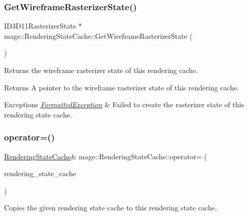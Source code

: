 \subsubsection{\texorpdfstring{Get\+Wireframe\+Rasterizer\+State()}{GetWireframeRasterizerState()}}
{\footnotesize\ttfamily I\+D3\+D11\+Rasterizer\+State $\ast$ mage\+::\+Rendering\+State\+Cache\+::\+Get\+Wireframe\+Rasterizer\+State (\begin{DoxyParamCaption}{ }\end{DoxyParamCaption})}

Returns the wireframe rasterizer state of this rendering cache.

\begin{DoxyReturn}{Returns}
A pointer to the wireframe rasterizer state of this rendering cache. 
\end{DoxyReturn}

\begin{DoxyExceptions}{Exceptions}
{\em \hyperlink{structmage_1_1_formatted_exception}{Formatted\+Exception}} & Failed to create the rasterizer state of this rendering state cache. \\
\hline
\end{DoxyExceptions}
\hypertarget{structmage_1_1_rendering_state_cache_a9534ceabde1d3f9f318f90d2ceec7646}{}\label{structmage_1_1_rendering_state_cache_a9534ceabde1d3f9f318f90d2ceec7646} 
\subsubsection{\texorpdfstring{operator=()}{operator=()}\hspace{0.1cm}{\footnotesize\ttfamily [1/2]}}
{\footnotesize\ttfamily \hyperlink{structmage_1_1_rendering_state_cache}{Rendering\+State\+Cache}\& mage\+::\+Rendering\+State\+Cache\+::operator= (\begin{DoxyParamCaption}\item[{const \hyperlink{structmage_1_1_rendering_state_cache}{Rendering\+State\+Cache} \&}]{rendering\+\_\+state\+\_\+cache }\end{DoxyParamCaption})\hspace{0.3cm}{\ttfamily [delete]}}

Copies the given rendering state cache to this rendering state cache.


